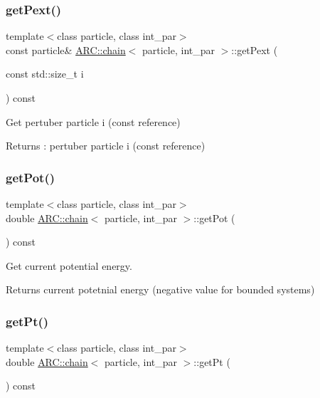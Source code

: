 \subsubsection{\texorpdfstring{get\+Pext()}{getPext()}}
{\footnotesize\ttfamily template$<$class particle, class int\+\_\+par$>$ \\
const particle\& \hyperlink{classARC_1_1chain}{A\+R\+C\+::chain}$<$ particle, int\+\_\+par $>$\+::get\+Pext (\begin{DoxyParamCaption}\item[{const std\+::size\+\_\+t}]{i }\end{DoxyParamCaption}) const\hspace{0.3cm}{\ttfamily [inline]}}



Get pertuber particle i (const reference) 

\begin{DoxyReturn}{Returns}
\+: pertuber particle i (const reference) 
\end{DoxyReturn}
\hypertarget{classARC_1_1chain_ade5db39891ff7a2d10ac38786ab866c1}{}\label{classARC_1_1chain_ade5db39891ff7a2d10ac38786ab866c1} 
\subsubsection{\texorpdfstring{get\+Pot()}{getPot()}}
{\footnotesize\ttfamily template$<$class particle, class int\+\_\+par$>$ \\
double \hyperlink{classARC_1_1chain}{A\+R\+C\+::chain}$<$ particle, int\+\_\+par $>$\+::get\+Pot (\begin{DoxyParamCaption}{ }\end{DoxyParamCaption}) const\hspace{0.3cm}{\ttfamily [inline]}}



Get current potential energy. 

\begin{DoxyReturn}{Returns}
current potetnial energy (negative value for bounded systems) 
\end{DoxyReturn}
\hypertarget{classARC_1_1chain_a1404204bd5665aa2d12d57cf653b779c}{}\label{classARC_1_1chain_a1404204bd5665aa2d12d57cf653b779c} 
\subsubsection{\texorpdfstring{get\+Pt()}{getPt()}}
{\footnotesize\ttfamily template$<$class particle, class int\+\_\+par$>$ \\
double \hyperlink{classARC_1_1chain}{A\+R\+C\+::chain}$<$ particle, int\+\_\+par $>$\+::get\+Pt (\begin{DoxyParamCaption}{ }\end{DoxyParamCaption}) const\hspace{0.3cm}{\ttfamily [inline]}}




